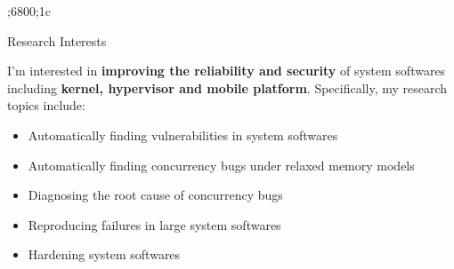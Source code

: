 ;6800;1c\begin{rSection}{Research Interests}
\newcommand{\eg}{\textit{e}.\textit{g}.\xspace}

I'm interested in \textbf{improving the reliability and security} of
system softwares including \textbf{kernel, hypervisor and mobile
  platform}. Specifically, my research topics include:

\begin{itemize}[leftmargin=*,itemsep=-5pt]
\item{Automatically finding vulnerabilities in system softwares}
\item{Automatically finding concurrency bugs under relaxed memory models}
\item{Diagnosing the root cause of concurrency bugs}
\item{Reproducing failures in large system softwares}
\item{Hardening system softwares}
\end{itemize}

\end{rSection}

